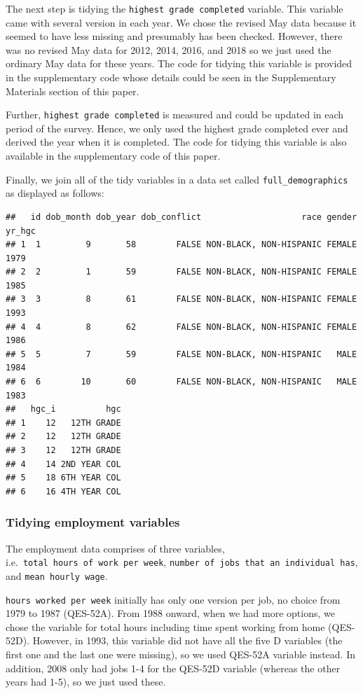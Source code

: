 \documentclass{article}
\begin{document}
The next step is tidying the \texttt{highest\ grade\ completed} variable. This variable came with several version in each year. We chose the revised May data because it seemed to have less missing and presumably has been checked. However, there was no revised May data for 2012, 2014, 2016, and 2018 so we just used the ordinary May data for these years. The code for tidying this variable is provided in the supplementary code whose details could be seen in the Supplementary Materials section of this paper.

Further, \texttt{highest\ grade\ completed} is measured and could be updated in each period of the survey. Hence, we only used the highest grade completed ever and derived the year when it is completed. The code for tidying this variable is also available in the supplementary code of this paper.

Finally, we join all of the tidy variables in a data set called \texttt{full\_demographics} as displayed as follows:

\begin{verbatim}
##   id dob_month dob_year dob_conflict                    race gender yr_hgc
## 1  1         9       58        FALSE NON-BLACK, NON-HISPANIC FEMALE   1979
## 2  2         1       59        FALSE NON-BLACK, NON-HISPANIC FEMALE   1985
## 3  3         8       61        FALSE NON-BLACK, NON-HISPANIC FEMALE   1993
## 4  4         8       62        FALSE NON-BLACK, NON-HISPANIC FEMALE   1986
## 5  5         7       59        FALSE NON-BLACK, NON-HISPANIC   MALE   1984
## 6  6        10       60        FALSE NON-BLACK, NON-HISPANIC   MALE   1983
##   hgc_i          hgc
## 1    12   12TH GRADE
## 2    12   12TH GRADE
## 3    12   12TH GRADE
## 4    14 2ND YEAR COL
## 5    18 6TH YEAR COL
## 6    16 4TH YEAR COL
\end{verbatim}

\hypertarget{tidying-employment-variables}{%
\subsubsection{Tidying employment variables}\label{tidying-employment-variables}}

The employment data comprises of three variables, i.e.~\texttt{total\ hours\ of\ work\ per\ week}, \texttt{number\ of\ jobs\ that\ an\ individual\ has}, and \texttt{mean\ hourly\ wage}.

\texttt{hours\ worked\ per\ week} initially has only one version per job, no choice from 1979 to 1987 (QES-52A). From 1988 onward, when we had more options, we chose the variable for total hours including time spent working from home (QES-52D). However, in 1993, this variable did not have all the five D variables (the first one and the last one were missing), so we used QES-52A variable instead. In addition, 2008 only had jobs 1-4 for the QES-52D variable (whereas the other years had 1-5), so we just used these.
\end{document}
